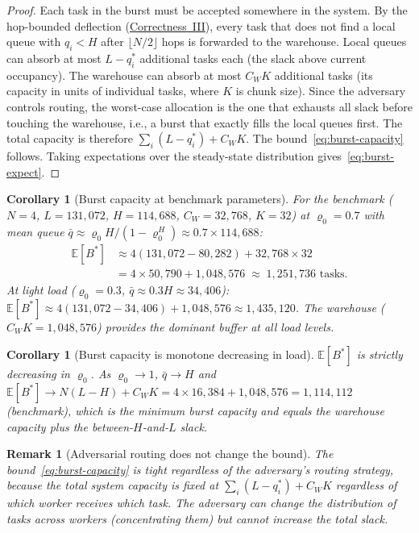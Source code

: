 \documentclass[11pt,a4paper]{report}
\newtheorem{corollary}[theorem]{Corollary}
\newtheorem{remark}{Remark}[section]
\newcommand{\rhozero}{\varrho_0}
\newcommand{\qbar}{\bar{q}}
\begin{document}
\begin{proof}
Each task in the burst must be accepted somewhere in the system.
By the hop-bounded deflection (\hyperref[chap:livelock]{Correctness~III}),
every task that does not find a local queue with $q_i < H$ after
$\lfloor N/2 \rfloor$ hops is forwarded to the warehouse.
Local queues can absorb at most $L - q_i^*$ additional tasks each
(the slack above current occupancy).
The warehouse can absorb at most $C_W K$ additional tasks
(its capacity in units of individual tasks, where $K$ is chunk size).
Since the adversary controls routing, the worst-case allocation is the
one that exhausts all slack before touching the warehouse,
i.e., a burst that exactly fills the local queues first.
The total capacity is therefore $\sum_i(L-q_i^*) + C_W K$.
The bound~\eqref{eq:burst-capacity} follows.
Taking expectations over the steady-state distribution gives~\eqref{eq:burst-expect}.
\end{proof}

\begin{corollary}[Burst capacity at benchmark parameters]
\label{cor:burst-bench}
For the benchmark ($N=4$, $L=131{,}072$, $H=114{,}688$, $C_W=32{,}768$, $K=32$)
at $\rhozero = 0.7$ with mean queue $\qbar \approx \rhozero H/(1-\rhozero^H)
\approx 0.7 \times 114{,}688$:
\begin{align*}
  \mathbb{E}[B^*]
  &\approx 4(131{,}072 - 80{,}282) + 32{,}768 \times 32 \\
  &= 4 \times 50{,}790 + 1{,}048{,}576
  \;\approx\; 1{,}251{,}736 \text{ tasks}.
\end{align*}
At light load ($\rhozero = 0.3$, $\qbar \approx 0.3H \approx 34{,}406$):
$\mathbb{E}[B^*] \approx 4(131{,}072 - 34{,}406) + 1{,}048{,}576 \approx 1{,}435{,}120$.
The warehouse ($C_W K = 1{,}048{,}576$) provides the dominant buffer at
all load levels.
\end{corollary}

\begin{corollary}[Burst capacity is monotone decreasing in load]
\label{cor:burst-mono}
$\mathbb{E}[B^*]$ is strictly decreasing in $\rhozero$.
As $\rhozero \to 1$, $\qbar \to H$ and
$\mathbb{E}[B^*] \to N(L-H) + C_W K = 4 \times 16{,}384 + 1{,}048{,}576 = 1{,}114{,}112$
(benchmark), which is the minimum burst capacity and equals the warehouse
capacity plus the between-$H$-and-$L$ slack.
\end{corollary}

\begin{remark}[Adversarial routing does not change the bound]
The bound~\eqref{eq:burst-capacity} is tight regardless of the adversary's
routing strategy, because the total system capacity is fixed at
$\sum_i(L-q_i^*) + C_WK$ regardless of which worker receives which task.
The adversary can change the \emph{distribution} of tasks across workers
(concentrating them) but cannot increase the total slack.
\end{remark}
\end{document}
